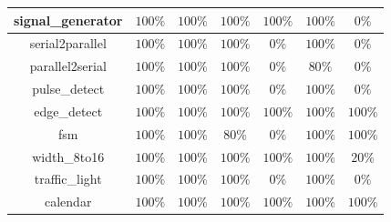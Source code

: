 \begin{tabular}{c|cc|cc|cc}
signal\_generator & \color{black} {\cellcolor{lightblue}} $100\%$ & \color{black} {\cellcolor{lightgreen}} $100\%$ & \color{black} {\cellcolor{lightblue}} $100\%$ & \color{black} {\cellcolor{lightgreen}} $100\%$ & \color{black} {\cellcolor{lightblue}} $100\%$ & $0\%$ \\ \midrule
serial2parallel & \color{black} {\cellcolor{lightblue}} $100\%$ & \color{black} {\cellcolor{lightgreen}} $100\%$ & \color{black} {\cellcolor{lightblue}} $100\%$ & $0\%$ & \color{black} {\cellcolor{lightblue}} $100\%$ & $0\%$ \\ \midrule
parallel2serial & \color{black} {\cellcolor{lightblue}} $100\%$ & \color{black} {\cellcolor{lightgreen}} $100\%$ & \color{black} {\cellcolor{lightblue}} $100\%$ & $0\%$ & $80\%$ & $0\%$ \\ \midrule
pulse\_detect & \color{black} {\cellcolor{lightblue}} $100\%$ & \color{black} {\cellcolor{lightgreen}} $100\%$ & \color{black} {\cellcolor{lightblue}} $100\%$ & $0\%$ & \color{black} {\cellcolor{lightblue}} $100\%$ & $0\%$ \\ \midrule
edge\_detect & \color{black} {\cellcolor{lightblue}} $100\%$ & \color{black} {\cellcolor{lightgreen}} $100\%$ & \color{black} {\cellcolor{lightblue}} $100\%$ & \color{black} {\cellcolor{lightgreen}} $100\%$ & \color{black} {\cellcolor{lightblue}} $100\%$ & \color{black} {\cellcolor{lightgreen}} $100\%$ \\ \midrule
fsm & \color{black} {\cellcolor{lightblue}} $100\%$ & \color{black} {\cellcolor{lightgreen}} $100\%$ & $80\%$ & $0\%$ & \color{black} {\cellcolor{lightblue}} $100\%$ & \color{black} {\cellcolor{lightgreen}} $100\%$ \\ \midrule
width\_8to16 & \color{black} {\cellcolor{lightblue}} $100\%$ & \color{black} {\cellcolor{lightgreen}} $100\%$ & \color{black} {\cellcolor{lightblue}} $100\%$ & \color{black} {\cellcolor{lightgreen}} $100\%$ & \color{black} {\cellcolor{lightblue}} $100\%$ & $20\%$ \\ \midrule
traffic\_light & \color{black} {\cellcolor{lightblue}} $100\%$ & \color{black} {\cellcolor{lightgreen}} $100\%$ & \color{black} {\cellcolor{lightblue}} $100\%$ & $0\%$ & \color{black} {\cellcolor{lightblue}} $100\%$ & $0\%$ \\ \midrule
calendar & \color{black} {\cellcolor{lightblue}} $100\%$ & \color{black} {\cellcolor{lightgreen}} $100\%$ & \color{black} {\cellcolor{lightblue}} $100\%$ & \color{black} {\cellcolor{lightgreen}} $100\%$ & \color{black} {\cellcolor{lightblue}} $100\%$ & \color{black} {\cellcolor{lightgreen}} $100\%$ \\ \midrule

\end{tabular}

